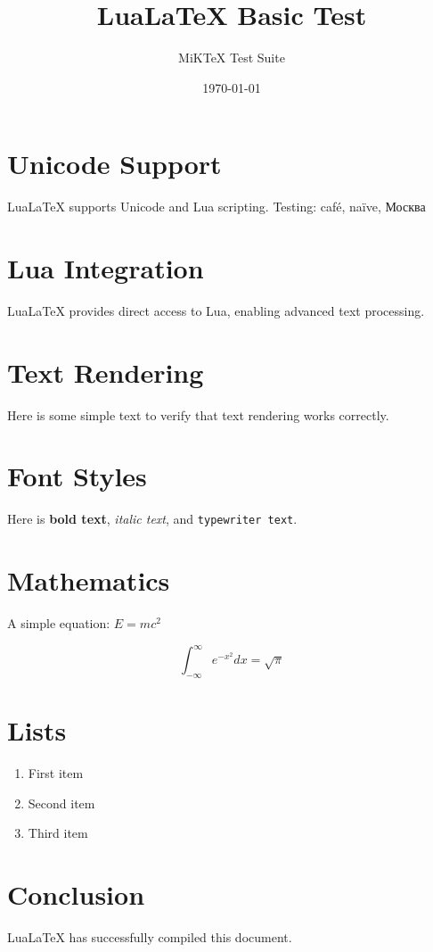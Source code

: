 \documentclass{article}
\title{LuaLaTeX Basic Test}
\author{MiKTeX Test Suite}
\date{\today}
\begin{document}
\maketitle

\section{Unicode Support}
LuaLaTeX supports Unicode and Lua scripting. Testing: café, naïve, Москва

\section{Lua Integration}
LuaLaTeX provides direct access to Lua, enabling advanced text processing.

\section{Text Rendering}
Here is some simple text to verify that text rendering works correctly.

\section{Font Styles}
Here is \textbf{bold text}, \textit{italic text}, and \texttt{typewriter text}.

\section{Mathematics}
A simple equation: $E = mc^2$

\[
\int_{-\infty}^{\infty} e^{-x^2} dx = \sqrt{\pi}
\]

\section{Lists}
\begin{enumerate}
  \item First item
  \item Second item
  \item Third item
\end{enumerate}

\section{Conclusion}
LuaLaTeX has successfully compiled this document.
\end{document}
